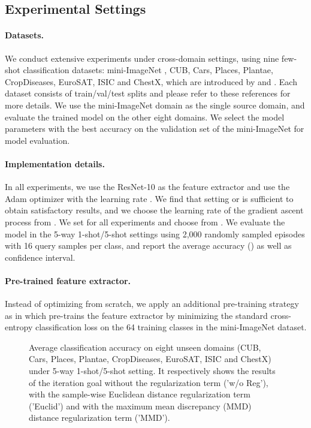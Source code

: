 \documentclass{article}
\begin{document}
\subsection{Experimental Settings}
\paragraph{Datasets.} We conduct extensive experiments under cross-domain settings, using nine few-shot classification datasets: mini-ImageNet \cite{DBLP:conf/iclr/RaviL17}, CUB, Cars, Places, Plantae, CropDiseases, EuroSAT, ISIC and ChestX, which are introduced by \cite{DBLP:conf/iclr/TsengLH020} and \cite{guo2020broader}. Each dataset consists of train/val/test splits and please refer to these references for more details. We use the mini-ImageNet domain as the single source domain, and evaluate the trained model on the other eight domains. We select the model parameters with the best accuracy on the validation set of the mini-ImageNet for model evaluation.

\paragraph{Implementation details.} In all experiments, we use the ResNet-10 \cite{he2016deep} as the feature extractor and use the Adam optimizer with the learning rate . We find that setting  or  is sufficient to obtain satisfactory results, and we choose the learning rate of the gradient ascent process  from . We set  for all experiments and choose  from . We evaluate the model in the 5-way 1-shot/5-shot settings using 2,000 randomly sampled episodes with 16 query samples per class, and report the average accuracy () as well as  confidence interval.

\paragraph{Pre-trained feature extractor.} Instead of optimizing from scratch, we apply an additional pre-training strategy as in \cite{DBLP:conf/iclr/TsengLH020} which pre-trains the feature extractor by minimizing the standard cross-entropy classification loss on the 64 training classes in the mini-ImageNet dataset.

\begin{figure}
    \centering
    \caption{Average classification accuracy on eight unseen domains (CUB, Cars, Places, Plantae, CropDiseases, EuroSAT, ISIC and ChestX) under 5-way 1-shot/5-shot setting. It respectively shows the results of the iteration goal without the regularization term ('w/o Reg'), with the sample-wise Euclidean distance regularization term ('Euclid') and with the maximum mean discrepancy (MMD) distance regularization term ('MMD').}
    \label{fig3}
\end{figure}
\end{document}
